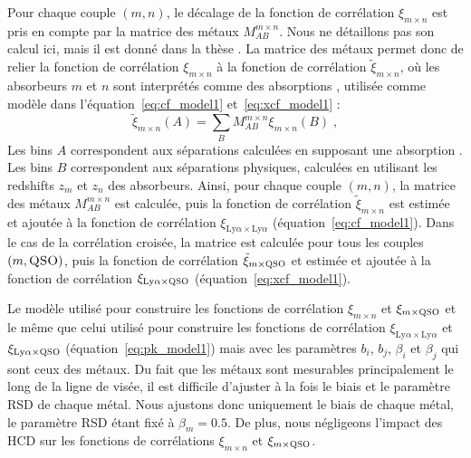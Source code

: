 \documentclass[11pt, twoside, a4paper, openright]{report}
\begin{document}
Pour chaque couple $(m, n)$, le décalage de la fonction de corrélation $\xi_{m\times n}$ est pris en compte par la matrice des métaux $M_{AB}^{m\times n}$.
Nous ne détaillons pas son calcul ici, mais il est donné dans la thèse \textcite{CITE:Victoria}. La matrice des métaux permet donc de relier la fonction de corrélation $\xi_{m\times n}$ à la fonction de corrélation $\tilde \xi_{m\times n}$, où les absorbeurs $m$ et $n$ sont interprétés comme des absorptions \lya{}, utilisée comme modèle dans l'équation~\ref{eq:cf_model1} et~\ref{eq:xcf_model1} :
\begin{equation}
  \tilde \xi_{m \times n}(A) = \sum_B M_{AB}^{m\times n} \xi_{m\times n}(B) \; ,
\end{equation}
Les bins $A$ correspondent aux séparations calculées en supposant une absorption \lya{}. Les bins $B$ correspondent aux séparations physiques, calculées en utilisant les redshifts $z_m$ et $z_n$ des absorbeurs.
Ainsi, pour chaque couple $(m, n)$, la matrice des métaux $M_{AB}^{m\times n}$ est calculée, puis la fonction de corrélation $\tilde \xi_{m \times n}$ est estimée et ajoutée à la fonction de corrélation $\xi_{\mathrm{Ly}\alpha\times\mathrm{Ly}\alpha}$ (équation~\ref{eq:cf_model1}).
Dans le cas de la corrélation croisée, la matrice est calculée pour tous les couples $(m, \textsc{QSO})$, puis la fonction de corrélation $\tilde \xi_{m \times \textsc{QSO}}$ et estimée et ajoutée à la fonction de corrélation $\xi_{\mathrm{Ly}\alpha\times\textsc{QSO}}$ (équation~\ref{eq:xcf_model1}).

Le modèle utilisé pour construire les fonctions de corrélation $\xi_{m\times n}$ et $\xi_{m\times \textsc{QSO}}$ et le même que celui utilisé pour construire les fonctions de corrélation $\xi_{\mathrm{Ly}\alpha\times\mathrm{Ly}\alpha}$ et $\xi_{\mathrm{Ly}\alpha\times\textsc{QSO}}$ (équation~\ref{eq:pk_model1}) mais avec les paramètres $b_i$, $b_j$, $\beta_i$ et $\beta_j$ qui sont ceux des métaux. Du fait que les métaux sont mesurables principalement le long de la ligne de visée, il est difficile d'ajuster à la fois le biais et le paramètre RSD de chaque métal. Nous ajustons donc uniquement le biais de chaque métal, le paramètre RSD étant fixé à $\beta_m = \num{0.5}$. De plus, nous négligeons l'impact des HCD sur les fonctions de corrélations $\xi_{m\times n}$ et $\xi_{m\times \textsc{QSO}}$.
\end{document}
